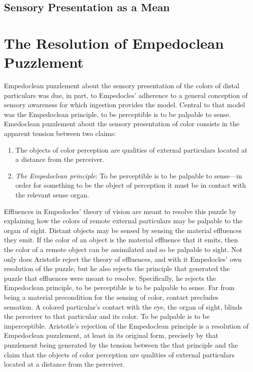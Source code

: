
\subsection{Sensory Presentation as a Mean} %
\label{sub:sensory_presentation_as_a_mean}



\section{The Resolution of Empedoclean Puzzlement} %
\label{sec:the_resolution_of_empedoclean_puzzlement}

Empedoclean puzzlement about the sensory presentation of the colors of distal particulars was due, in part, to Empedocles' adherence to a general conception of sensory awareness for which ingestion provides the model. Central to that model was the Empedoclean principle, to be perceptible is to be palpable to sense. Emedoclean puzzlement about the sensory presentation of color consists in the apparent tension between two claims:
\begin{enumerate}[(1)]
    \item The objects of color perception are qualities of external particulars located at a distance from the perceiver.
    \item \emph{The Empedoclean principle}: To be perceptible is to be palpable to sense---in order for something to be the object of perception it must be in contact with the relevant sense organ.
\end{enumerate}
Effluences in Empedocles' theory of vision are meant to resolve this puzzle by explaining how the colors of remote external particulars may be palpable to the organ of sight. Distant objects may be sensed by sensing the material effluences they emit. If the color of an object is the material effluence that it emits, then the color of a remote object can be assimilated and so be palpable to sight. Not only does Aristotle reject the theory of effluences, and with it Empedocles' own resolution of the puzzle, but he also rejects the principle that generated the puzzle that effluences were meant to resolve. Specifically, he rejects the Empedoclean principle, to be perceptible is to be palpable to sense. Far from being a material precondition for the sensing of color, contact precludes sensation. A colored particular's contact with the eye, the organ of sight, blinds the perceiver to that particular and its color. To be palpable is to be imperceptible. Aristotle's rejection of the Empedoclean principle is a resolution of Empedoclean puzzlement, at least in its original form, precisely by that puzzlement being generated by the tension between the that principle and the claim that the objects of color perception are qualities of external particulars located at a distance from the perceiver.

